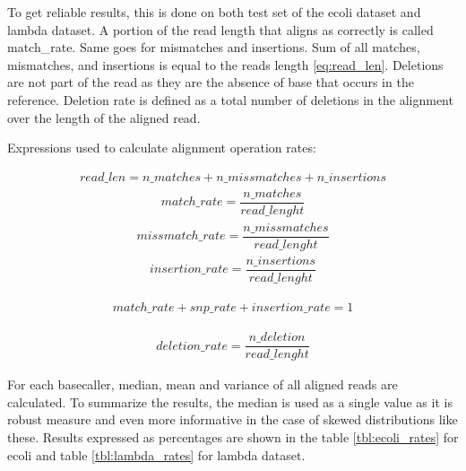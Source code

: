 \documentclass[times, utf8, diplomski, numeric, english]{fer}
\begin{document}
To get reliable results, this is done on both test set of the ecoli dataset and lambda dataset. 
A portion of the read length that aligns as correctly is called match\_rate. Same goes for mismatches and insertions. 
Sum of all matches, mismatches, and insertions is equal to the reads length \ref{eq:read_len}. Deletions are not part of the read as they are the absence of base that occurs in the reference. Deletion rate is defined as a total number of deletions in the alignment over the length of the aligned read. 

Expressions used to calculate alignment operation rates:

\begin{equation}
\begin{gathered}
\label{eq:read_len}
read\_len =  n\_matches + n\_missmatches + n\_insertions 
\end{gathered}
\end{equation}
\begin{equation}
\begin{gathered}
match\_rate = \dfrac{n\_matches}{read\_lenght}
\end{gathered}
\end{equation}
\begin{equation}
\begin{gathered}
missmatch\_rate = \dfrac{n\_missmatches}{read\_lenght}
\end{gathered}
\end{equation}
\begin{equation}
\begin{gathered}
insertion\_rate = \dfrac{n\_insertions}{read\_lenght}
\end{gathered}
\end{equation}

\begin{equation}
\begin{gathered}
match\_rate  + snp\_rate + insertion\_rate = 1
\end{gathered}
\end{equation}


\begin{equation}
\begin{gathered}
deletion\_rate = \dfrac{n\_deletion}{read\_lenght}
\end{gathered}
\end{equation}



For each basecaller, median, mean and variance of all aligned reads are calculated. To summarize the results, the median is used as a single value as it is robust measure and even more informative in the case of skewed distributions like these.  Results expressed as percentages are shown in the table \ref{tbl:ecoli_rates} for ecoli and table \ref{tbl:lambda_rates} for lambda dataset. 
\end{document}
